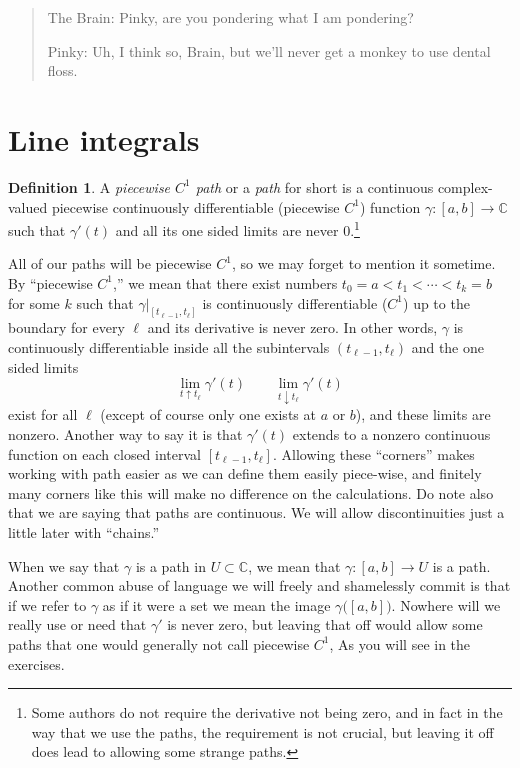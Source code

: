 \documentclass[12pt,openany]{book}
\newcommand{\C}{{\mathbb{C}}}
\newcommand{\myindex}[1]{#1\index{#1}}
\theoremstyle{plain}
\theoremstyle{remark}
\theoremstyle{definition}
\newtheorem{defn}[thm]{Definition}
\newenvironment{myquote}{%
    \begin{quote}%
    \begingroup\itshape
}{%
    \endgroup%
    \end{quote}
}
\theoremstyle{exercise}
\theoremstyle{example}
\begin{document}
\begin{myquote}
The Brain: Pinky, are you pondering what I am pondering?

Pinky:  Uh, I think so, Brain, but we'll never get a monkey to use dental floss.
\end{myquote}


\section{Line integrals}
\label{sec:lineints}

\begin{defn}
A \emph{\myindex{piecewise $C^1$ path}} or a \emph{\myindex{path}} for short
is
a continuous complex-valued piecewise continuously
differentiable (piecewise $C^1$) function $\gamma \colon [a,b] \to \C$ 
such that $\gamma'(t)$ and all its one sided limits are never
0.\footnote{Some authors do not require the derivative not being zero, and
in fact in the way that we use the paths, the requirement is not crucial,
but leaving it off does lead to allowing some strange paths.}
\end{defn}

All of our paths will be piecewise $C^1$, so we may forget to mention it
sometime.
By ``piecewise $C^1$,''
we mean that there exist numbers $t_0 = a < t_1 < \cdots
< t_k = b$ for some $k$ such that $\gamma|_{[t_{\ell-1},t_\ell]}$ is
continuously differentiable ($C^1$) up to
the boundary for every $\ell$ and its derivative is never zero.
In other words, $\gamma$ is continuously differentiable inside all the
subintervals $(t_{\ell-1},t_\ell)$ and the one sided limits
\begin{equation*}
\lim_{t \uparrow t_\ell} \gamma'(t) \qquad
\lim_{t \downarrow t_\ell} \gamma'(t)
\end{equation*}
exist for all $\ell$ (except of course only one exists at $a$ or $b$),
and these limits are nonzero.
Another way to say it is that $\gamma'(t)$ extends to a nonzero
continuous function on each closed interval $[t_{\ell-1},t_{\ell}]$.
Allowing these ``corners'' makes working with path easier
as we can define them easily piece-wise, and finitely many corners like
this will make no difference on the calculations.
Do note also that we are saying that paths are continuous.  We will allow
discontinuities just a little later with ``chains.''

When we say that $\gamma$ is a path in $U \subset \C$, we mean that
$\gamma \colon [a,b] \to U$ is a path.  Another common abuse of language we
will freely and shamelessly commit is that if we refer to $\gamma$
as if it were a set we mean the image $\gamma\bigl([a,b]\bigr)$.
Nowhere will we really use or need that $\gamma'$ is never zero,
but leaving that off would allow some paths that one would generally not
call piecewise $C^1$,
As you will see in the exercises.
\end{document}
